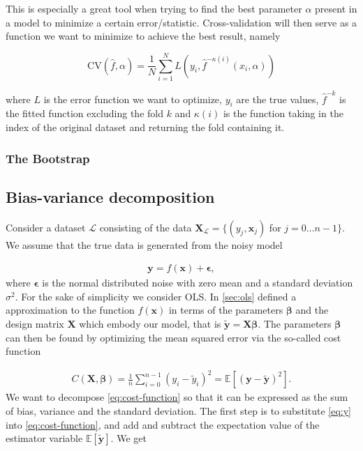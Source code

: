 This is especially a great tool when trying to find the best parameter $\alpha$ present in a model to minimize a certain error/statistic. Cross-validation will then serve as a function we want to minimize to achieve the best result, namely

\begin{equation}
  \text{CV}(\hat f, \alpha) = \frac{1}{N}\sum_{i=1}^N L\left(y_i, \hat f^{-\kappa(i)}(x_i, \alpha)\right)
\end{equation}

where $L$ is the error function we want to optimize, $y_i$ are the true values, $\hat f^{-k}$ is the fitted function excluding the fold $k$ and $\kappa(i)$ is the function taking in the index of the original dataset and returning the fold containing it. 

\subsubsection{The Bootstrap}


\subsection{Bias-variance decomposition}\label{sec:bv_decomp}
Consider a dataset \ensuremath{\mathcal{L}} consisting of the data \ensuremath{\mathbf{X}_\mathcal{L}=\{(y_j, \boldsymbol{x}_j)} for \ensuremath{j=0\ldots n-1\}}. We assume that the true data is generated from the noisy model

\begin{align}
    \mathbf{y}=f(\mathbf{x})+\boldsymbol{\epsilon}, 
    \label{eq:y}
\end{align} where \ensuremath{\boldsymbol{\epsilon}} is the normal distributed noise with zero mean and a standard deviation \ensuremath{\sigma^2}. For the sake of simplicity we consider OLS. In \cref{sec:ols} defined a approximation to the function \ensuremath{f(\mathbf{x})} in terms of the parameters \ensuremath{\boldsymbol{\beta}} and the design matrix \ensuremath{\mathbf{X}} which embody our model, that is \ensuremath{\mathbf{\tilde{y}}=\mathbf{X}\boldsymbol{\beta}}. The parameters \ensuremath{\boldsymbol{\beta}} can then be found by optimizing the mean squared error via the so-called cost function

\begin{align}
    C(\mathbf{X}, \boldsymbol{\beta}) = \frac{1}{n}\sum_{i=0}^{n-1}(y_i-\tilde{y}_i)^2=\mathbb{E}\left[(\mathbf{y}-\mathbf{\tilde{y}})^2\right].
    \label{eq:cost-function}
\end{align} We want to decompose \cref{eq:cost-function} so that it can be expressed as the sum of bias, variance and the standard deviation. The first step is to substitute \cref{eq:y} into \cref{eq:cost-function}, and add and subtract the expectation value of the estimator variable \ensuremath{\mathbb{E}[\mathbf{\tilde{y}}]}. We get 


